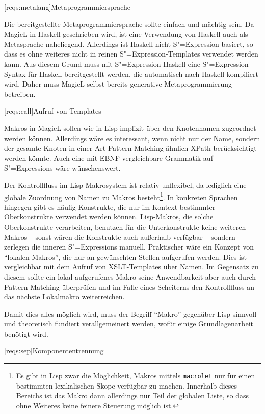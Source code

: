 \documentclass[12pt, a4paper, bibgerm]{scrbook}
\newcommand\icode[1]{\lstinline?#1?}
\newcommand\lsection{}
\newcommand{\sexp}{S"=Expression}
\newcommand{\sexps}{S"=Expressions}
\begin{document}
\lsection[reqs:metalang]{Metaprogrammiersprache}

Die bereitgestellte Metaprogrammiersprache sollte einfach und mächtig
sein. Da MagicL in Haskell geschrieben wird, ist eine Verwendung von
Haskell auch als Metasprache naheliegend. Allerdings ist Haskell nicht
\sexp{}-basiert, so dass es ohne weiteres nicht in reinen
\sexp{}-Templates verwendet werden kann. Aus diesem Grund muss mit
\sexp{}-Haskell eine \sexp{}-Syntax für Haskell bereitgestellt werden,
die automatisch nach Haskell kompiliert wird. Daher muss MagicL selbst
bereits generative Metaprogrammierung betreiben.

\lsection[reqs:call]{Aufruf von Templates}

Makros in MagicL sollen wie in Lisp implizit über den Knotennamen
zugeordnet werden können. Allerdings wäre es interessant, wenn nicht nur
der Name, sondern der gesamte Knoten in einer Art Pattern-Matching
ähnlich XPath berücksichtigt werden könnte. Auch eine mit EBNF
\cite[S.43f]{EBNF} vergleichbare Grammatik auf \sexps{} wäre
wünschenswert. 

Der Kontrollfluss im Lisp-Makrosystem ist relativ unflexibel, da
lediglich eine globale Zuordnung von Namen zu Makros besteht\footnote{Es
  gibt in Lisp zwar die Möglichkeit, Makros mittels \icode{macrolet} nur
  für einen bestimmten lexikalischen Skope verfügbar zu machen.
  Innerhalb dieses Bereichs ist das Makro dann allerdings nur Teil der
  globalen Liste, so dass ohne Weiteres keine feinere Steuerung möglich
  ist.}. In konkreten Sprachen hingegen gibt es häufig Konstrukte, die
nur im Kontext bestimmter Oberkonstrukte verwendet werden
können. Lisp-Makros, die solche Oberkonstrukte verarbeiten, benutzen für
die Unterkonstrukte keine weiteren Makros -- sonst wären die Konstrukte
auch außerhalb verfügbar -- sondern zerlegen die inneren \sexps{}
manuell. Praktischer wäre ein Konzept von "`lokalen Makros"', die nur an
gewünschten Stellen aufgerufen werden. Dies ist vergleichbar mit dem
Aufruf von XSLT-Templates über Namen. Im Gegensatz zu diesem sollte ein
lokal aufgerufenes Makro seine Anwendbarkeit aber auch durch
Pattern-Matching überprüfen und im Falle eines Scheiterns den
Kontrollfluss an das nächste Lokalmakro weiterreichen.

Damit dies alles möglich wird, muss der Begriff "`Makro"' gegenüber Lisp
sinnvoll und theoretisch fundiert verallgemeinert werden, wofür einige
Grundlagenarbeit benötigt wird.

\lsection[reqs:sep]{Komponententrennung}
\end{document}

